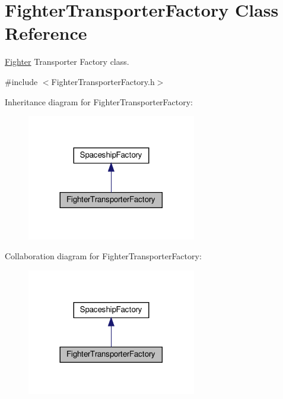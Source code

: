 \hypertarget{classFighterTransporterFactory}{}\section{Fighter\+Transporter\+Factory Class Reference}
\label{classFighterTransporterFactory}


\hyperlink{classFighter}{Fighter} Transporter Factory class.  




{\ttfamily \#include $<$Fighter\+Transporter\+Factory.\+h$>$}



Inheritance diagram for Fighter\+Transporter\+Factory\+:\nopagebreak
\begin{figure}[H]
\begin{center}
\leavevmode
\includegraphics[width=209pt]{classFighterTransporterFactory__inherit__graph}
\end{center}
\end{figure}


Collaboration diagram for Fighter\+Transporter\+Factory\+:\nopagebreak
\begin{figure}[H]
\begin{center}
\leavevmode
\includegraphics[width=209pt]{classFighterTransporterFactory__coll__graph}
\end{center}
\end{figure}
